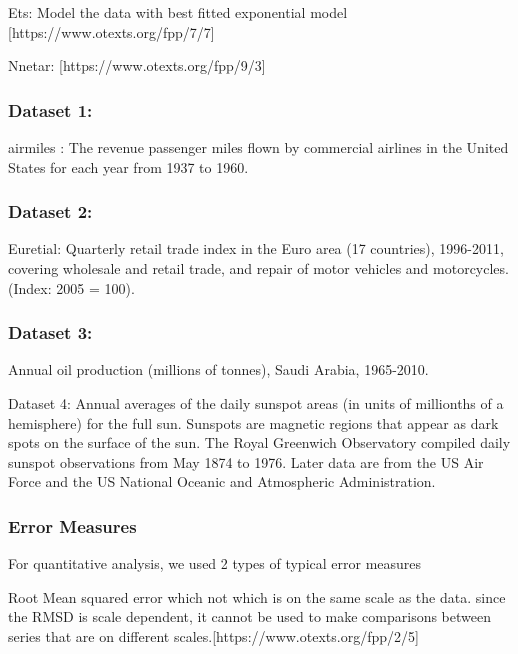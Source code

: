 Ets: Model the data with best fitted exponential model [https://www.otexts.org/fpp/7/7]

	Nnetar: [https://www.otexts.org/fpp/9/3]

\subsubsection{Dataset 1:}

airmiles : The revenue passenger miles flown by commercial airlines in the United States for each year from 1937 to 1960.


\subsubsection{Dataset 2:}


Euretial: Quarterly retail trade index in the Euro area (17 countries), 1996-2011, covering wholesale and retail trade, and repair of motor vehicles and motorcycles. (Index: 2005 = 100).


\subsubsection{Dataset 3:}

Annual oil production (millions of tonnes), Saudi Arabia, 1965-2010.




Dataset 4: Annual averages of the daily sunspot areas (in units of millionths of a hemisphere) for the full sun. Sunspots are magnetic regions that appear as dark spots on the surface of the sun. The Royal Greenwich Observatory compiled daily sunspot observations from May 1874 to 1976. Later data are from the US Air Force and the US National Oceanic and Atmospheric Administration.



\subsubsection{Error Measures}



For quantitative analysis, we used 2 types of  typical error measures 

Root Mean squared error which  not which is on the same scale as the data. since the RMSD is scale dependent, it cannot be used to make comparisons between series that are on different scales.[https://www.otexts.org/fpp/2/5]



